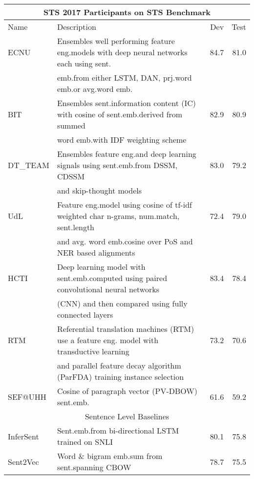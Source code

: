 \documentclass[11pt,a4paper]{article}
\begin{document}
\begin{table*}[t]
\small
\begin{center}
\begin{tabular}{|l|l|r|r|} 
\hline
\multicolumn{4}{|c|}{STS 2017 Participants on STS Benchmark} \\
\hline
Name & Description & 	Dev &	Test\\
\hline
ECNU & 
Ensembles well performing feature eng.\@ models with deep neural networks each using sent.\@
& 84.7 	&81.0\\
    & emb.\@ from either LSTM, DAN, prj.\@ word emb.\@ or avg.\@ word emb.\@ \cite{tian-EtAl:2017:SemEval}  & & \\
BIT & Ensembles sent.\@ information content (IC) with cosine of sent.\@ emb.\@ derived from summed & 82.9 &80.9\\
    & word emb.\@ with IDF weighting scheme \cite{wu-EtAl:2017:SemEval1} & & \\
DT\_TEAM & Ensembles feature eng.\@ and deep learning signals using sent.\@ emb.\@ from DSSM, CDSSM & 83.0 	&79.2\\
 & and skip-thought models \cite{maharjan-EtAl:2017:SemEval} & & \\
UdL & Feature eng.\@ model using cosine of tf-idf weighted char n-grams, num.\@ match, sent.\@ length & 72.4 & 79.0 \\
 &  and avg. word emb.\@ cosine over PoS and NER based alignments  \cite{alnatsheh-EtAl:2017:SemEval} & &  \\
HCTI &  Deep learning model with sent.\@ emb.\@ computed using paired convolutional neural networks & 83.4 	&78.4\\
 & (CNN) and then compared using fully connected layers \cite{shao:2017:SemEval} & & \\
RTM & Referential translation machines (RTM) use a feature eng. model with transductive learning &  73.2\rlap{$^*$} & 70.6 \\
 & and parallel feature decay algorithm (ParFDA) training instance selection  \cite{biccici:2017:SemEval,Bicici:RTM:WMT2017} & & \\
SEF@UHH & Cosine of paragraph vector (PV-DBOW) sent.\@ emb.\@ \cite{duma-menzel:2017:SemEval}   & 61.6 	&59.2 \\
\hline
\multicolumn{4}{|c|}{Sentence Level Baselines} \\
\hline
InferSent & Sent.\@ emb.\@ from bi-directional LSTM trained on SNLI
\cite{Conneau2017} & 80.1 & 75.8 \\
Sent2Vec & Word \& bigram emb.\@ sum from sent.\@ spanning CBOW \cite{pgj2017unsup} & 78.7 & 75.5\\

\end{tabular}
\end{center}
\end{table*}
\end{document}
